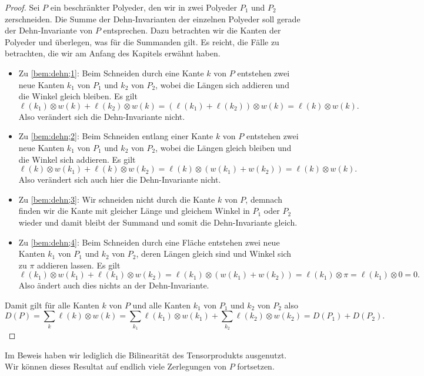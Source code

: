 \documentclass[11pt,titlepage]{article}
\theoremstyle{definition}
\theoremstyle{remark}
\begin{document}
	\begin{proof}
		Sei $P$ ein beschränkter Polyeder, den wir in zwei Polyeder $P_1$ und $P_2$ zerschneiden. 
		Die Summe der  Dehn-Invarianten der einzelnen Polyeder soll gerade der Dehn-Invariante von $P$ 
		entsprechen. Dazu betrachten wir die Kanten der Polyeder und überlegen, was für die Summanden gilt. Es 
		reicht, die Fälle zu betrachten, die wir am Anfang des Kapitels erwähnt haben.
		\begin{itemize}
			\item Zu \ref{bem:dehn;1}: Beim Schneiden durch eine Kante $k$ von $P$ entstehen zwei 
			neue Kanten $k_1$ von $P_1$ und $k_2$ von $P_2$, wobei die Längen sich addieren und die Winkel  
			gleich bleiben. Es gilt
			\[ \ell(k_1)\otimes w(k) + \ell(k_2)\otimes w(k)=(\ell(k_1)+\ell(k_2))\otimes w(k)=
			\ell(k)\otimes w(k).\]
			Also verändert sich die Dehn-Invariante nicht.
			\item Zu \ref{bem:dehn;2}: Beim Schneiden entlang einer Kante $k$ von $P$ entstehen zwei neue Kanten 
			$k_1$ von $P_1$ und $k_2$ von $P_2$, wobei die Längen gleich bleiben und die Winkel sich addieren. 
			Es gilt
			\[ \ell(k)\otimes  w(k_1)+\ell(k)\otimes w(k_2)=\ell(k)\otimes (w(k_1)+w(k_2))=
			\ell(k)\otimes w(k).\]
			Also verändert sich auch hier die Dehn-Invariante nicht.
			\item Zu \ref{bem:dehn;3}: Wir schneiden nicht durch die Kante $k$ von $P$, demnach finden wir die Kante mit gleicher Länge und gleichem 
			Winkel in $P_1$ oder $P_2$ wieder und damit bleibt 
			der Summand und somit die Dehn-Invariante gleich. 
			\item Zu \ref{bem:dehn;4}: Beim Schneiden durch eine Fläche entstehen zwei neue Kanten $k_1$ von 
			$P_1$ und $k_2$ von $P_2$, deren Längen gleich sind und Winkel sich zu $\pi$ addieren lassen. Es gilt 
			\[ \ell(k_1)\otimes w(k_1)+\ell(k_1)\otimes w(k_2)=\ell(k_1)\otimes (w(k_1)+w(k_2))=
			\ell(k_1)\otimes \pi=\ell(k_1)\otimes 0=0. \]
			Also ändert auch dies nichts an der Dehn-Invariante.
		\end{itemize}
		Damit gilt für alle Kanten $k$ von $P$ und alle Kanten $k_1$ von $P_1$ 
		und $k_2$ von $P_2$ also
		\[D(P)=\sum_k \ell(k)\otimes w(k)=\sum_{k_1}\ell(k_1)\otimes w(k_1)+
		\sum_{k_2}\ell(k_2)\otimes w(k_2)=D(P_1)+D(P_2).\]
	\end{proof}
	
	Im Beweis haben wir lediglich die Bilinearität des Tensorprodukts ausgenutzt. 
	Wir können dieses Resultat auf endlich viele Zerlegungen von $P$ fortsetzen. 
		
\end{document}
